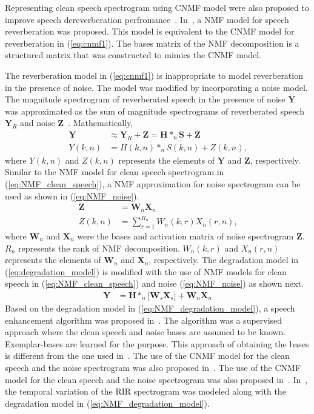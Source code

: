 Representing clean speech spectrogram using CNMF model were also proposed to improve speech dereverberation perfromance~\cite{Mirsamadi2014}. In~\cite{Kallasjoki2014}, a NMF model for speech reverberation was proposed. This model is equivalent to the CNMF model for reverberation in (\ref{eq:cnmf1}). The bases matrix of the NMF decomposition is a structured matrix that was constructed to mimics the CNMF model.

The reverberation model in (\ref{eq:cnmf1}) is inappropriate to model reverberation in the presence of noise.  The model was modified by incorporating a noise model. The magnitude spectrogram of reverberated speech in the presence of noise $\mathbf{Y}$ was approximated as the sum of magnitude spectrograms of reverberated speech $\mathbf{Y}_R$ and noise $\mathbf{Z}$~\cite{li2018multichannel}. Mathematically,
\begin{align}
\mathbf{Y} &\approx \mathbf{Y}_R+\mathbf{Z} = \mathbf{H}*_n\mathbf{S}+\mathbf{Z}\nonumber \\
Y(k,n) &= H(k,n)*_n S(k,n) + Z(k,n) \text{,}
\label{eq:degradation_model}
\end{align}
where $Y(k,n)$ and $Z(k,n)$ represents the elements of $\mathbf{Y}$ and $\mathbf{Z}$, respectively. Similar to the NMF model for clean speech spectrogram in (\ref{eq:NMF_clean_speech}), a NMF approximation for noise spectrogram can be used as shown in (\ref{eq:NMF_noise}).
\begin{align}
\mathbf{Z}&= \mathbf{W}_n\mathbf{X}_n \nonumber \\
Z(k,n)    &= \sum_{r=1}^{R_n} W_n(k,r)X_n(r,n)\text{,}
\label{eq:NMF_noise}
\end{align}
where $\mathbf{W}_n$ and $\mathbf{X}_n$ were the bases and activation matrix of noise spectrogram $\mathbf{Z}$. $R_n$ represents the rank of NMF decomposition. $W_n(k,r)$ and $X_n(r,n)$ represents the elements of $\mathbf{W}_n$ and $\mathbf{X}_n$, respectively. The  degradation model in (\ref{eq:degradation_model}) is modified with the use of NMF models for clean speech in (\ref{eq:NMF_clean_speech}) and noise (\ref{eq:NMF_noise}) as shown next.
\begin{align}
\mathbf{Y} & = \mathbf{H}*_n \bigg[ \mathbf{W}_s\mathbf{X}_s \bigg]+\mathbf{W}_n\mathbf{X}_n
\label{eq:NMF_degradation_model}
\end{align}
Based on the degradation model in (\ref{eq:NMF_degradation_model}), a speech enhancement algorithm was proposed in~\cite{baby2016supervised}. The algorithm was a supervised approach where the clean speech and noise bases are assumed to be known. Exemplar-bases are learned for the purpose. This approach of obtaining the bases is different from the one used in~\cite{mohammadiha2016speech, Mohammadiha2015}. The use of the CNMF model for the clean speech and the noise spectrogram was also proposed in~\cite{baby2016supervised, baby2016phd}. The use of the CNMF model for the clean speech and the noise spectrogram was also proposed in~\cite{baby2016supervised, baby2016phd}. In~\cite{baby2016supervised}, the temporal variation of the RIR spectrogram was modeled along with the degradation model in (\ref{eq:NMF_degradation_model}).

